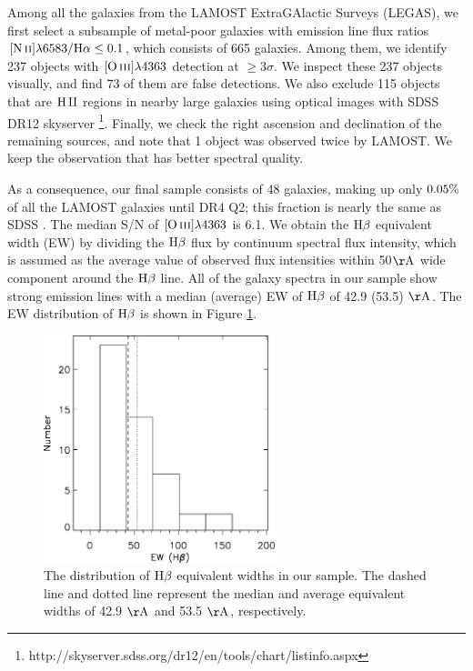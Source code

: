 \documentclass[usenatbib]{raa}
\begin{document}
Among all the galaxies from the LAMOST ExtraGAlactic Surveys (LEGAS), we first 
select
a subsample of metal-poor galaxies
with emission line flux ratios $\hbox{[N\,{\sc ii}]}\lambda6583/\hbox{H$\alpha$} \le 0.1$, which consists of 665 galaxies.
Among them, we identify  237 objects with  $\hbox{[O\,{\sc iii}]}\lambda4363$
detection at $\ge 3 \sigma$.  
We inspect these 237 objects visually, and find 73 of them are false 
detections. We also exclude 
 115 objects  
that are $\rm \hii$ regions in nearby large galaxies  using optical 
images with SDSS 
DR12 skyserver \footnote{http://skyserver.sdss.org/dr12/en/tools/chart/listinfo.aspx}. 
 Finally, we check the right ascension and declination of  the remaining sources, and 
note that  1 object was observed  twice by LAMOST.  We 
keep the observation that has better spectral quality.

As a consequence, our final sample consists of  48 galaxies, making up
only $\rm 0.05\%$ of all the LAMOST galaxies until
DR4 Q2; this fraction is nearly the same as SDSS \citep{2014ApJ...780..122L}. 
The median S/N of $\hbox{[O\,{\sc iii}]}\lambda4363$ is  6.1. 
We obtain the $\hbox{H$\beta$}$ equivalent width (EW) by dividing the $\hbox{H$\beta$}$ flux by 
continuum spectral flux
intensity, which is assumed as the average value of observed flux intensities 
within
50$\rm \AA$ wide component around the $\hbox{H$\beta$}$ line. 
All of the galaxy spectra in our sample show strong emission lines with a 
median (average) EW of $\hbox{H$\beta$}$ of  42.9 (53.5) $\mathrm{\AA}$. 
The EW distribution of  $\hbox{H$\beta$}$ is shown in Figure \ref{hist_hb}.

\begin{figure}[h]
\center
\includegraphics[width=0.6\textwidth]{fig1.eps}
\caption{The distribution of $\hbox{H$\beta$}$ equivalent widths in our sample. 
The dashed line and dotted line represent the median and average equivalent 
widths of 
42.9 $\rm \mathrm{\AA}$ and 53.5 $\rm \mathrm{\AA}$, respectively.} 
\label{hist_hb}
\end{figure}
\end{document}

